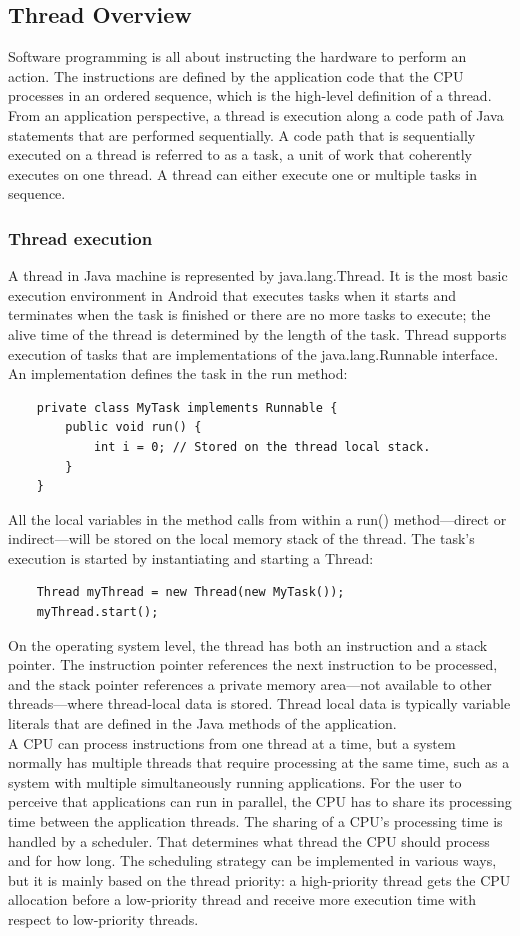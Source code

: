 \subsection{Thread Overview}
Software programming is all about instructing the hardware to perform an action. The instructions are defined by the application code that the CPU processes in an ordered sequence, which is the high-level definition of a thread. From an application perspective, a thread is execution along a code path of Java statements that are performed sequentially. A code path that is sequentially executed on a thread is referred to as a task, a unit of work that coherently executes on one thread. A thread can either execute one or multiple tasks in sequence.

\subsubsection{Thread execution}
A thread in Java machine is represented by java.lang.Thread. It is the most basic execution environment in Android that executes tasks when it starts and terminates when the task is finished or there are no more tasks to execute; the alive time of the thread is determined by the length of the task. Thread supports execution of tasks that are implementations of the java.lang.Runnable interface. An implementation defines the task in the run method:
\begin{lstlisting}
	private class MyTask implements Runnable {
		public void run() {
			int i = 0; // Stored on the thread local stack.
		}
	}
\end{lstlisting}
All the local variables in the method calls from within a run() method—direct or indirect—will be stored on the local memory stack of the thread. The task’s execution is started by instantiating and starting a Thread:
\begin{lstlisting}
	Thread myThread = new Thread(new MyTask());
	myThread.start();
\end{lstlisting}
On the operating system level, the thread has both an instruction and a stack pointer. The instruction pointer references the next instruction to be processed, and the stack pointer references a private memory area—not available to other threads—where thread-local data is stored. Thread local data is typically variable literals that are defined in the Java methods of the application.\\
A CPU can process instructions from one thread at a time, but a system normally has multiple threads that require processing at the same time, such as a system with multiple simultaneously running applications. For the user to perceive that applications can run in parallel, the CPU has to share its processing time between the application threads. The sharing of a CPU’s processing time is handled by a scheduler. That determines what thread the CPU should process and for how long. The scheduling strategy can be implemented in various ways, but it is mainly based on the thread priority: a high-priority thread gets the CPU allocation before a low-priority thread and receive more execution time with respect to low-priority threads.\\
